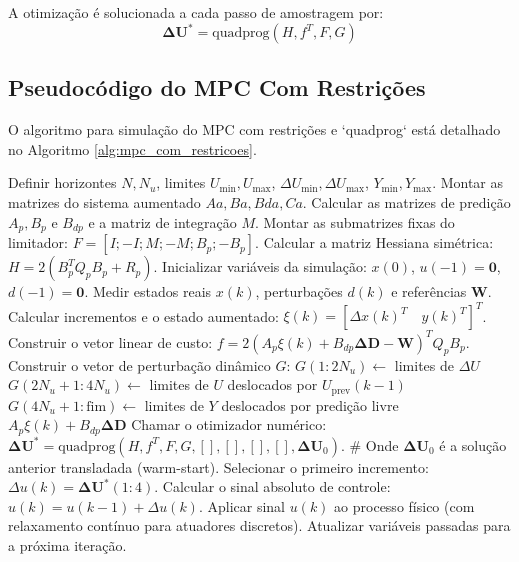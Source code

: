 \documentclass[12pt,journal,onecolumn]{article}
\begin{document}
A otimização é solucionada a cada passo de amostragem por:
\begin{equation}
\bm{\Delta U}^* = \text{quadprog}(H, f^T, F, G)
\end{equation}

\subsection{Pseudocódigo do MPC Com Restrições}

O algoritmo para simulação do MPC com restrições e `quadprog` está detalhado no Algoritmo \ref{alg:mpc_com_restricoes}.

\begin{algorithm}
\caption{Controle Preditivo Incremental Com Restrições via QP}
\label{alg:mpc_com_restricoes}
\begin{algorithmic}[1]
\STATE Definir horizontes $N, N_u$, limites $U_{\text{min}}, U_{\text{max}}$, $\Delta U_{\text{min}}, \Delta U_{\text{max}}$, $Y_{\text{min}}, Y_{\text{max}}$.
\STATE Montar as matrizes do sistema aumentado $Aa, Ba, Bda, Ca$.
\STATE Calcular as matrizes de predição $A_p, B_p$ e $B_{dp}$ e a matriz de integração $M$.
\STATE Montar as submatrizes fixas do limitador: $F = [I; -I; M; -M; B_p; -B_p]$.
\STATE Calcular a matriz Hessiana simétrica: $H = 2(B_p^T Q_p B_p + R_p)$.
\STATE Inicializar variáveis da simulação: $x(0)$, $u(-1) = \bm{0}$, $d(-1) = \bm{0}$.
\STATE
{}
\STATE Medir estados reais $x(k)$, perturbações $d(k)$ e referências $\bm{W}$.
\STATE Calcular incrementos e o estado aumentado: $\xi(k) = [\Delta x(k)^T \quad y(k)^T]^T$.
\STATE Construir o vetor linear de custo: $f = 2(A_p \xi(k) + B_{dp} \bm{\Delta D} - \bm{W})^T Q_p B_p$.
\STATE Construir o vetor de perturbação dinâmico $G$:
\STATE \quad $G(1:2N_u) \leftarrow$ limites de $\Delta U$
\STATE \quad $G(2N_u+1:4N_u) \leftarrow$ limites de $U$ deslocados por $U_{\text{prev}}(k-1)$
\STATE \quad $G(4N_u+1:\text{fim}) \leftarrow$ limites de $Y$ deslocados por predição livre $A_p \xi(k) + B_{dp} \bm{\Delta D}$
\STATE Chamar o otimizador numérico: $\bm{\Delta U}^* = \text{quadprog}(H, f^T, F, G, [], [], [], [], \bm{\Delta U}_0)$.
\# Onde $\bm{\Delta U}_0$ é a solução anterior transladada (warm-start).
\STATE Selecionar o primeiro incremento: $\Delta u(k) = \bm{\Delta U}^*(1:4)$.
\STATE Calcular o sinal absoluto de controle: $u(k) = u(k-1) + \Delta u(k)$.
\STATE Aplicar sinal $u(k)$ ao processo físico (com relaxamento contínuo para atuadores discretos).
\STATE Atualizar variáveis passadas para a próxima iteração.
\end{algorithmic}
\end{algorithm}
\end{document}
